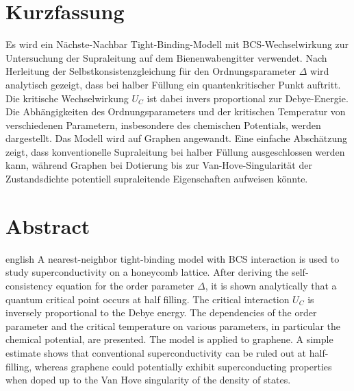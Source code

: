 \thispagestyle{plain}

\section*{Kurzfassung}

Es wird ein Nächste-Nachbar Tight-Binding-Modell mit BCS-Wechselwirkung zur Untersuchung der Supraleitung auf dem Bienenwabengitter verwendet.
Nach Herleitung der Selbstkonsistenzgleichung für den Ordnungsparameter $\Delta$ wird analytisch gezeigt, dass bei halber Füllung ein quantenkritischer Punkt auftritt.
Die kritische Wechselwirkung $U_C$ ist dabei invers proportional zur Debye-Energie.
Die Abhängigkeiten des Ordnungsparameters und der kritischen Temperatur von verschiedenen Parametern, insbesondere des chemischen Potentials, werden dargestellt.
Das Modell wird auf Graphen angewandt. 
Eine einfache Abschätzung zeigt, dass konventionelle Supraleitung bei halber Füllung ausgeschlossen werden kann, während Graphen bei Dotierung bis zur Van-Hove-Singularität der Zustandsdichte potentiell supraleitende Eigenschaften aufweisen könnte.

\section*{Abstract}
\begin{foreignlanguage}{english}
A nearest-neighbor tight-binding model with BCS interaction is used to study superconductivity on a honeycomb lattice.
After deriving the self-consistency equation for the order parameter $\Delta$, it is shown analytically that a quantum critical point occurs at half filling.
The critical interaction $U_C$ is inversely proportional to the Debye energy.
The dependencies of the order parameter and the critical temperature on various parameters, in particular the chemical potential, are presented.
The model is applied to graphene. 
A simple estimate shows that conventional superconductivity can be ruled out at half-filling, whereas graphene could potentially exhibit superconducting properties when doped up to the Van Hove singularity of the density of states.
\end{foreignlanguage}